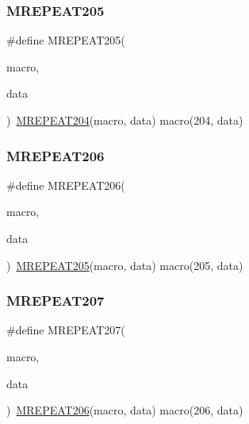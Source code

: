 \mbox{\label{group__group__sam0__utils__mrepeat_gae672303fe7f3ba300d061715db22723f}} 
\subsubsection{\texorpdfstring{MREPEAT205}{MREPEAT205}}
{\footnotesize\ttfamily \#define M\+R\+E\+P\+E\+A\+T205(\begin{DoxyParamCaption}\item[{}]{macro,  }\item[{}]{data }\end{DoxyParamCaption})~\mbox{\hyperlink{group__group__sam0__utils__mrepeat_ga0e339097dee89fd4eaf9885f32db1c16}{M\+R\+E\+P\+E\+A\+T204}}(macro, data)   macro(204, data)}

\mbox{\label{group__group__sam0__utils__mrepeat_ga899fa83ef3f1e32c26c7decdb29e5747}} 
\subsubsection{\texorpdfstring{MREPEAT206}{MREPEAT206}}
{\footnotesize\ttfamily \#define M\+R\+E\+P\+E\+A\+T206(\begin{DoxyParamCaption}\item[{}]{macro,  }\item[{}]{data }\end{DoxyParamCaption})~\mbox{\hyperlink{group__group__sam0__utils__mrepeat_gae672303fe7f3ba300d061715db22723f}{M\+R\+E\+P\+E\+A\+T205}}(macro, data)   macro(205, data)}

\mbox{\label{group__group__sam0__utils__mrepeat_ga3f4ed7437c340ec027580d80fdbfc353}} 
\subsubsection{\texorpdfstring{MREPEAT207}{MREPEAT207}}
{\footnotesize\ttfamily \#define M\+R\+E\+P\+E\+A\+T207(\begin{DoxyParamCaption}\item[{}]{macro,  }\item[{}]{data }\end{DoxyParamCaption})~\mbox{\hyperlink{group__group__sam0__utils__mrepeat_ga899fa83ef3f1e32c26c7decdb29e5747}{M\+R\+E\+P\+E\+A\+T206}}(macro, data)   macro(206, data)}

